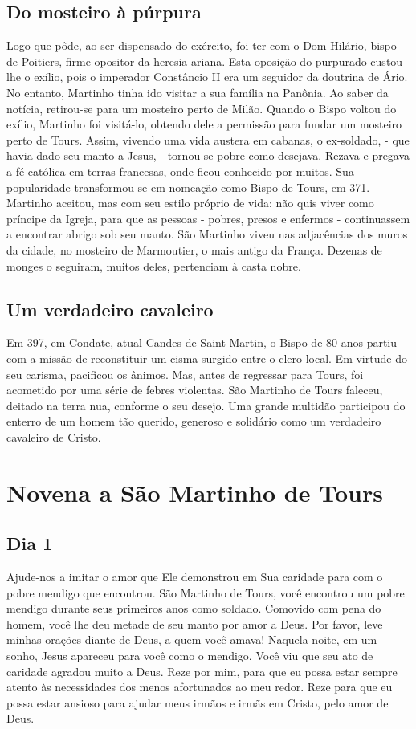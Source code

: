 \documentclass[a4paper,14pt,twoside]{extarticle} \usepackage[utf8]{inputenc}
\begin{document}
\subsection{Do mosteiro à púrpura}

Logo que pôde, ao ser dispensado do exército, foi ter com o Dom Hilário, bispo de Poitiers, firme opositor da heresia ariana.
Esta oposição do purpurado custou-lhe o exílio, pois o imperador Constâncio II era um seguidor da doutrina de Ário. No entanto, Martinho tinha ido visitar a sua família na Panônia. Ao saber da notícia, retirou-se para um mosteiro perto de Milão.
Quando o Bispo voltou do exílio, Martinho foi visitá-lo, obtendo dele a permissão para fundar um mosteiro perto de Tours. Assim, vivendo uma vida austera em cabanas, o ex-soldado, - que havia dado seu manto a Jesus, - tornou-se pobre como desejava. Rezava e pregava a fé católica em terras francesas, onde ficou conhecido por muitos.
Sua popularidade transformou-se em nomeação como Bispo de Tours, em 371. Martinho aceitou, mas com seu estilo próprio de vida: não quis viver como príncipe da Igreja, para que as pessoas - pobres, presos e enfermos - continuassem a encontrar abrigo sob seu manto.
São Martinho viveu nas adjacências dos muros da cidade, no mosteiro de Marmoutier, o mais antigo da França. Dezenas de monges o seguiram, muitos deles, pertenciam à casta nobre.

\subsection{Um verdadeiro cavaleiro}

Em 397, em Condate, atual Candes de Saint-Martin, o Bispo de 80 anos partiu com a missão de reconstituir um cisma surgido entre o clero local. Em virtude do seu carisma, pacificou os ânimos. Mas, antes de regressar para Tours, foi acometido por uma série de febres violentas.
São Martinho de Tours faleceu, deitado na terra nua, conforme o seu desejo. Uma grande multidão participou do enterro de um homem tão querido, generoso e solidário como um verdadeiro cavaleiro de Cristo.

\newpage


\section{Novena a São Martinho de Tours}

\subsection{Dia 1}
Ajude-nos a imitar o amor que Ele demonstrou em Sua caridade para com o pobre mendigo que encontrou. São Martinho de Tours, você encontrou um pobre mendigo durante seus primeiros anos como soldado. Comovido com pena do homem, você lhe deu metade de seu manto por amor a Deus. Por favor, leve minhas orações diante de Deus, a quem você amava! Naquela noite, em um sonho, Jesus apareceu para você como o mendigo. Você viu que seu ato de caridade agradou muito a Deus. Reze por mim, para que eu possa estar sempre atento às necessidades dos menos afortunados ao meu redor. Reze para que eu possa estar ansioso para ajudar meus irmãos e irmãs em Cristo, pelo amor de Deus. 
 
\end{document}
